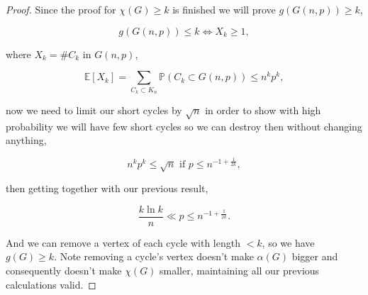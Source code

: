 \documentclass[12pt,twoside,a4paper]{book}
\numberwithin{equation}{section}
\let\log=\ln
\theoremstyle{remark}
\begin{document}
\begin{proof}
Since the proof for $\chi(G) \geq k$ is finished we will prove $g(G(n,p))\geq k$,

$$ g(G(n,p)) \leq k \iff X_k \geq 1,$$


where $X_k = \#  C_k$ in $G(n,p)$,

$$\mathbb{E}[X_k] = \sum_{C_k \subset K_n} \mathbb{P}(C_k \subset G(n,p) ) \leq n^kp^k,$$

now we need to limit our short cycles by $\sqrt{n}$ in order to show with high probability we will have few short cycles so we can destroy then without changing anything,

$$n^kp^k \leq \sqrt{n} \text{ if } p \leq n^{-1 + \frac{1}{2k}},$$

then getting together with our previous result,

$$\frac{k\log k}{n} \ll p \leq n^{-1 + \frac{1}{2k}}.$$

And we can remove a vertex of each cycle with length $<k$, so we have $g(G) \geq k$. Note removing a cycle's vertex doesn't make $\alpha(G)$ bigger and consequently doesn't make $\chi(G)$ smaller, maintaining all our previous calculations valid.
\end{proof}
\end{document}
